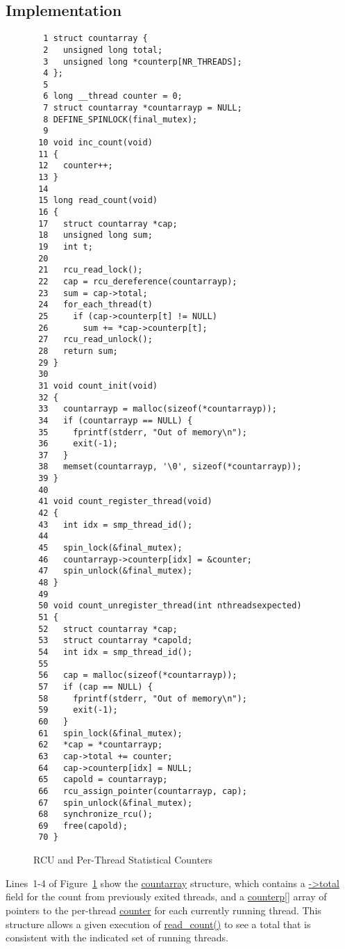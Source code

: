\subsection{Implementation}

\begin{figure}[bp]
{ \scriptsize
\begin{verbatim}
  1 struct countarray {
  2   unsigned long total;
  3   unsigned long *counterp[NR_THREADS];
  4 };
  5 
  6 long __thread counter = 0;
  7 struct countarray *countarrayp = NULL;
  8 DEFINE_SPINLOCK(final_mutex);
  9 
 10 void inc_count(void)
 11 {
 12   counter++;
 13 }
 14 
 15 long read_count(void)
 16 {
 17   struct countarray *cap;
 18   unsigned long sum;
 19   int t;
 20 
 21   rcu_read_lock();
 22   cap = rcu_dereference(countarrayp);
 23   sum = cap->total;
 24   for_each_thread(t)
 25     if (cap->counterp[t] != NULL)
 26       sum += *cap->counterp[t];
 27   rcu_read_unlock();
 28   return sum;
 29 }
 30 
 31 void count_init(void)
 32 {
 33   countarrayp = malloc(sizeof(*countarrayp));
 34   if (countarrayp == NULL) {
 35     fprintf(stderr, "Out of memory\n");
 36     exit(-1);
 37   }
 38   memset(countarrayp, '\0', sizeof(*countarrayp));
 39 }
 40 
 41 void count_register_thread(void)
 42 {
 43   int idx = smp_thread_id();
 44 
 45   spin_lock(&final_mutex);
 46   countarrayp->counterp[idx] = &counter;
 47   spin_unlock(&final_mutex);
 48 }
 49 
 50 void count_unregister_thread(int nthreadsexpected)
 51 {
 52   struct countarray *cap;
 53   struct countarray *capold;
 54   int idx = smp_thread_id();
 55 
 56   cap = malloc(sizeof(*countarrayp));
 57   if (cap == NULL) {
 58     fprintf(stderr, "Out of memory\n");
 59     exit(-1);
 60   }
 61   spin_lock(&final_mutex);
 62   *cap = *countarrayp;
 63   cap->total += counter;
 64   cap->counterp[idx] = NULL;
 65   capold = countarrayp;
 66   rcu_assign_pointer(countarrayp, cap);
 67   spin_unlock(&final_mutex);
 68   synchronize_rcu();
 69   free(capold);
 70 }
\end{verbatim}
}
\caption{RCU and Per-Thread Statistical Counters}
\label{fig:applyrcu:RCU and Per-Thread Statistical Counters}
\end{figure}

Lines~1-4 of
Figure~\ref{fig:applyrcu:RCU and Per-Thread Statistical Counters}
show the \url{countarray} structure, which contains a
\url{->total} field for the count from previously exited threads,
and a \url{counterp[]} array of pointers to the per-thread
\url{counter} for each currently running thread.
This structure allows a given execution of \url{read_count()}
to see a total that is consistent with the indicated set of running
threads.

